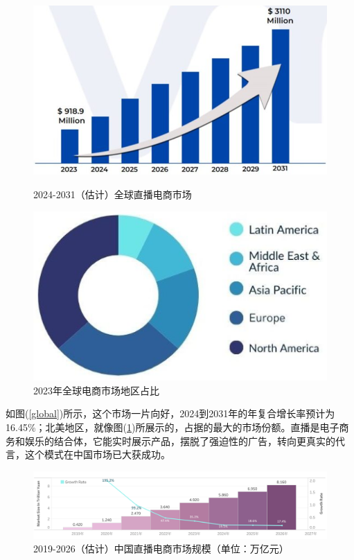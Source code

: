 \documentclass[12pt]{ctexart}
\begin{document}
\begin{figure}[htbp!]
    \begin{minipage}[t]{0.48\textwidth}
        \centering
        \includegraphics[width=\textwidth]{Images/1.png}
        \caption{2024-2031（估计）全球直播电商市场\cite{2}}
        \label{global}
    \end{minipage}
    \hfill
    \begin{minipage}[t]{0.48\textwidth}
        \centering
        \includegraphics[width=\textwidth]{Images/2.png}
        \caption{2023年全球电商市场地区占比 \cite{3}}
        \label{region}
    \end{minipage}
\end{figure}

如图(\ref{global})所示，这个市场一片向好，2024到2031年的年复合增长率预计为16.45\%；北美地区，就像图(\ref{region})所展示的，占据的最大的市场份额\cite{1}。直播是电子商务和娱乐的结合体，它能实时展示产品，摆脱了强迫性的广告，转向更真实的代言，这个模式在中国市场已大获成功\cite{1}。

\begin{figure}[htbp!]
    \centering
    \includegraphics[width=1\textwidth]{Images/3.png}
    \caption{2019-2026（估计）中国直播电商市场规模（单位：万亿元） \cite{3}}
    \label{china}
\end{figure}
\end{document}

